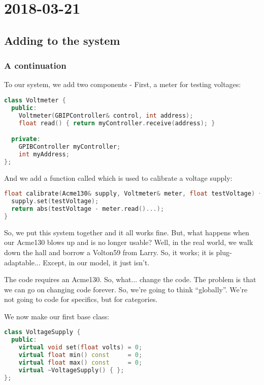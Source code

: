 \section{2018-03-21}

\subsection{Adding to the system}

\subsubsection{A continuation}

To our system, we add two components - First, a meter for testing voltages:

\begin{lstlisting}[language=C++]
class Voltmeter {
  public:
    Voltmeter(GBIPController& control, int address);
    float read() { return myController.receive(address); }

  private:
    GPIBController myController;
    int myAddress;
};
\end{lstlisting}

And we add a function called  which is used to calibrate a voltage supply:

\begin{lstlisting}[language=C++]
float calibrate(Acme130& supply, Voltmeter& meter, float testVoltage) {
  supply.set(testVoltage);
  return abs(testVoltage - meter.read()...);
}
\end{lstlisting} 

So, we put this system together and it all works fine. But, what happens when our Acme130 blows up and is no longer usable? Well, in the real world, we walk down the hall and borrow a Volton59 from Larry. So, it works; it is plug-adaptable... Except, in our model, it just isn't.

The code requires an Acme130. So, what... change the code. The problem is that we can go on changing code forever. So, we're going to think ``globally''. We're not going to code for specifics, but for categories.

We now make our first base class:

\begin{lstlisting}[language=C++]
class VoltageSupply {
  public:
    virtual void set(float volts) = 0;
    virtual float min() const     = 0;
    virtual float max() const     = 0;
    virtual ~VoltageSupply() { };
};
\end{lstlisting}


